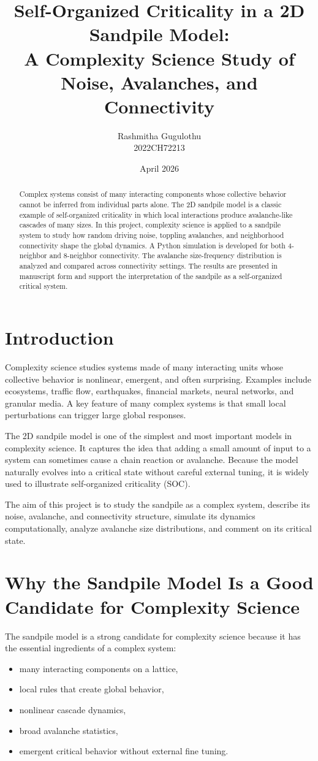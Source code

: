 \documentclass[12pt]{article}
\title{\textbf{Self-Organized Criticality in a 2D Sandpile Model:\\
A Complexity Science Study of Noise, Avalanches, and Connectivity}}
\author{Rashmitha Gugulothu \\ 2022CH72213}
\date{April 2026}
\begin{document}
\maketitle

\begin{abstract}
Complex systems consist of many interacting components whose collective behavior cannot be inferred from individual parts alone. The 2D sandpile model is a classic example of self-organized criticality in which local interactions produce avalanche-like cascades of many sizes. In this project, complexity science is applied to a sandpile system to study how random driving noise, toppling avalanches, and neighborhood connectivity shape the global dynamics. A Python simulation is developed for both 4-neighbor and 8-neighbor connectivity. The avalanche size-frequency distribution is analyzed and compared across connectivity settings. The results are presented in manuscript form and support the interpretation of the sandpile as a self-organized critical system.
\end{abstract}

\section{Introduction}
Complexity science studies systems made of many interacting units whose collective behavior is nonlinear, emergent, and often surprising. Examples include ecosystems, traffic flow, earthquakes, financial markets, neural networks, and granular media. A key feature of many complex systems is that small local perturbations can trigger large global responses.

The 2D sandpile model is one of the simplest and most important models in complexity science. It captures the idea that adding a small amount of input to a system can sometimes cause a chain reaction or avalanche. Because the model naturally evolves into a critical state without careful external tuning, it is widely used to illustrate self-organized criticality (SOC).

The aim of this project is to study the sandpile as a complex system, describe its noise, avalanche, and connectivity structure, simulate its dynamics computationally, analyze avalanche size distributions, and comment on its critical state.

\section{Why the Sandpile Model Is a Good Candidate for Complexity Science}
The sandpile model is a strong candidate for complexity science because it has the essential ingredients of a complex system:
\begin{itemize}
    \item many interacting components on a lattice,
    \item local rules that create global behavior,
    \item nonlinear cascade dynamics,
    \item broad avalanche statistics,
    \item emergent critical behavior without external fine tuning.
\end{itemize}
\end{document}
